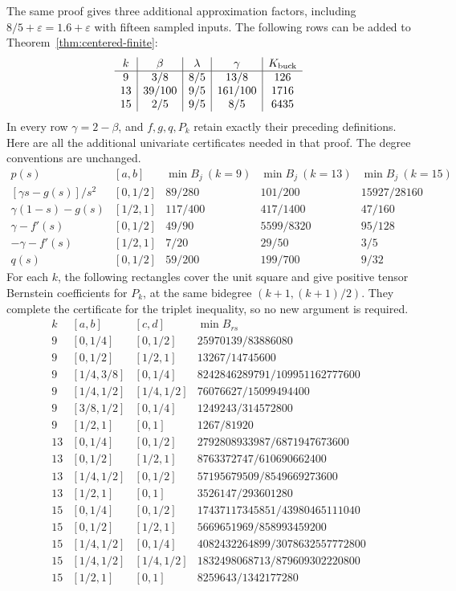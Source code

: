 \documentclass[11pt]{article}
\begin{document}
The same proof gives three additional approximation factors, including
$8/5+\varepsilon=1.6+\varepsilon$ with fifteen sampled inputs. The
following rows can be added to Theorem~\ref{thm:centered-finite}:
\[
\begin{array}{c|c|c|c|c}
 k&\beta&\lambda&\gamma&K_{\rm buck}\\\hline
 9&3/8&8/5&13/8&126\\
 13&39/100&9/5&161/100&1716\\
 15&2/5&9/5&8/5&6435
\end{array}
\]
In every row $\gamma=2-\beta$, and $f,g,q,P_k$ retain exactly their
preceding definitions. Here are all the additional univariate
certificates needed in that proof. The degree conventions are unchanged.
\[
\begin{array}{c|c|c|c|c}
 p(s)&[a,b]&\min B_j\ (k=9)&\min B_j\ (k=13)&\min B_j\ (k=15)\\\hline
 {}[\gamma s-g(s)]/s^2 &[0,1/2]&89/280&101/200&15927/28160\\
 \gamma(1-s)-g(s)&[1/2,1]&117/400&417/1400&47/160\\
 \gamma-f'(s)&[0,1/2]&49/90&5599/8320&95/128\\
 -\gamma-f'(s)&[1/2,1]&7/20&29/50&3/5\\
 q(s)&[0,1/2]&59/200&199/700&9/32
\end{array}
\]
For each $k$, the following rectangles cover the unit square and give
positive tensor Bernstein coefficients for $P_k$, at the same
bidegree $(k+1,(k+1)/2)$. They complete the certificate for the
triplet inequality, so no new argument is required.
\[
\begin{array}{c|c|c|c}
 k&[a,b]&[c,d]&\min B_{rs}\\\hline
 9 &[0,1/4]&[0,1/2]&25970139/83886080\\
 9 &[0,1/2]&[1/2,1]&13267/14745600\\
 9 &[1/4,3/8]&[0,1/4]&8242846289791/109951162777600\\
 9 &[1/4,1/2]&[1/4,1/2]&76076627/15099494400\\
 9 &[3/8,1/2]&[0,1/4]&1249243/314572800\\
 9 &[1/2,1]&[0,1]&1267/81920\\\hline
 13 &[0,1/4]&[0,1/2]&2792808933987/6871947673600\\
 13 &[0,1/2]&[1/2,1]&8763372747/610690662400\\
 13 &[1/4,1/2]&[0,1/2]&57195679509/8549669273600\\
 13 &[1/2,1]&[0,1]&3526147/293601280\\\hline
 15 &[0,1/4]&[0,1/2]&17437117345851/43980465111040\\
 15 &[0,1/2]&[1/2,1]&5669651969/858993459200\\
 15 &[1/4,1/2]&[0,1/4]&4082432264899/3078632557772800\\
 15 &[1/4,1/2]&[1/4,1/2]&1832498068713/879609302220800\\
 15 &[1/2,1]&[0,1]&8259643/1342177280
\end{array}
\]
\end{document}
